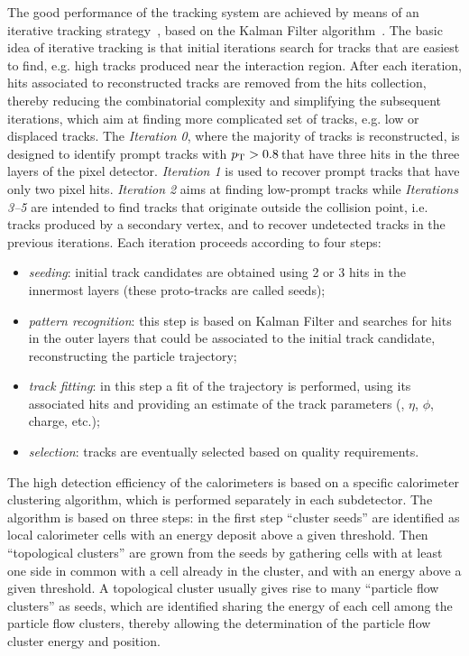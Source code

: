 The good performance of the tracking system are achieved by means of an iterative tracking strategy~\cite{Chatrchyan:2014fea}, based on the Kalman Filter algorithm~\cite{Billoir:1990we}. The basic idea of iterative tracking is that initial iterations search for tracks that are easiest to find, e.g. high \pt tracks produced near the interaction region. After each iteration, hits associated to reconstructed tracks are removed from the hits collection, thereby reducing the combinatorial complexity and simplifying the subsequent iterations, which aim at finding more complicated set of tracks, e.g. low \pt or displaced tracks. The \emph{Iteration 0}, where the majority of tracks is reconstructed, is designed to identify prompt tracks with $p_\mathrm{T}>0.8$\,\GeV that have three hits in the three layers of the pixel detector. \emph{Iteration 1} is used to recover prompt tracks that have only two pixel hits. \emph{Iteration 2} aims at finding low-\pt prompt tracks while \emph{Iterations 3--5} are intended to find tracks that originate outside the collision point, i.e. tracks produced by a secondary vertex, and to recover undetected tracks in the previous iterations. Each iteration proceeds according to four steps:
\begin{itemize}
\item \emph{seeding}: initial track candidates are obtained using 2 or 3 hits in the innermost layers (these proto-tracks are called seeds);
\item \emph{pattern recognition}: this step is based on Kalman Filter and searches for hits in the outer layers that could be associated to the initial track candidate, reconstructing the particle trajectory;
\item \emph{track fitting}: in this step a fit of the trajectory is performed, using its associated hits and providing an estimate of the track parameters (\pt, $\eta$, $\phi$, charge, etc.);
\item \emph{selection}: tracks are eventually selected based on quality requirements.
\end{itemize}

The high detection efficiency of the calorimeters is based on a specific calorimeter clustering algorithm, which is performed separately in each subdetector. The algorithm is based on three steps: in the first step ``cluster seeds'' are identified as local calorimeter cells with an energy deposit above a given threshold. Then ``topological clusters'' are grown from the seeds by gathering cells with at least one side in common with a cell already in the cluster, and with an energy above a given threshold. A topological cluster usually gives rise to many ``particle flow clusters'' as seeds, which are identified sharing the energy of each cell among the particle flow clusters, thereby allowing the determination of the particle flow cluster energy and position.


